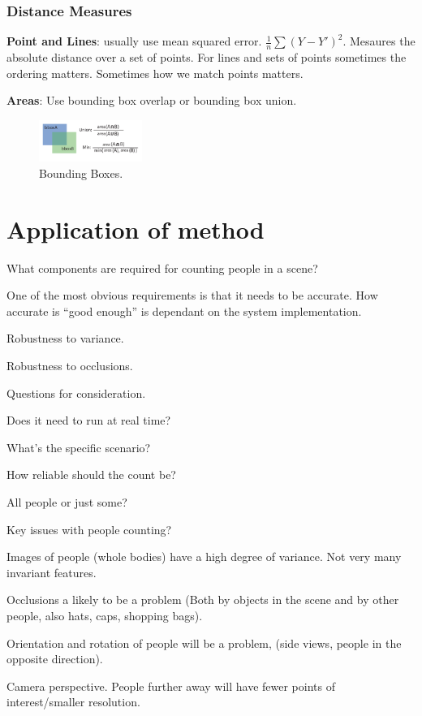 \documentclass[8pt]{extarticle}
\begin{document}
\begin{multicols}{2}
\subsubsection{Distance Measures}
\textbf{Point and Lines}: usually use mean squared error. $\frac{1}{n}\sum(Y - Y')^2$. Mesaures the absolute distance over a set of points. For lines and sets of points sometimes the ordering matters. Sometimes how we match points matters.

\textbf{Areas}: Use bounding box overlap or bounding box union.

\begin{figure}[H]
    \centering
    \includegraphics[width=0.3\textwidth]{bounding_box.png}
    \caption{Bounding Boxes.}
    \label{fig:bounding-box}
\end{figure}

\section{Application of method}
What components are required for counting people in a scene?
\begin{compactitem}
    \item One of the most obvious requirements is that it needs to be accurate. How accurate is ``good enough'' is dependant on the system implementation.
    \item Robustness to variance.
    \item Robustness to occlusions.
\end{compactitem}
Questions for consideration.
\begin{compactitem}
    \item Does it need to run at real time?
    \item What's the specific scenario?
    \item How reliable should the count be?
    \item All people or just some?
\end{compactitem}
Key issues with people counting?
\begin{compactitem}
    \item Images of people (whole bodies) have a high degree of variance. Not very many invariant features.
    \item Occlusions a likely to be a problem (Both by objects in the scene and by other people, also hats, caps, shopping bags).
    \item Orientation and rotation of people will be a problem, (side views, people in the opposite direction).
    \item Camera perspective. People further away will have fewer points of interest/smaller resolution.
\end{compactitem}


\end{multicols}
\end{document}
